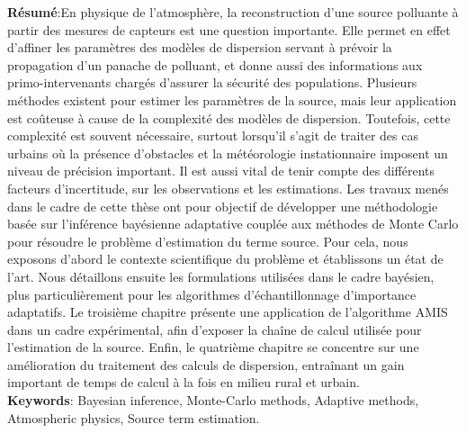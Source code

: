 {\small \textbf{Résumé}:En physique de l’atmosphère, la reconstruction d’une source polluante à partir des mesures de capteurs est une question importante. Elle permet en effet d’affiner les paramètres des modèles de dispersion servant à prévoir la propagation d’un panache de polluant, et donne aussi des informations aux primo-intervenants chargés d’assurer la sécurité des populations.
Plusieurs méthodes existent pour estimer les paramètres de la source, mais leur application est coûteuse à cause de la complexité des modèles de dispersion. Toutefois, cette complexité est souvent nécessaire, surtout lorsqu’il s’agit de traiter des cas urbains où la présence d’obstacles et la météorologie instationnaire imposent un niveau de précision important. Il est aussi vital de tenir compte des différents facteurs d’incertitude, sur les observations et les estimations.
Les travaux menés dans le cadre de cette thèse ont pour objectif de développer une méthodologie basée sur l’inférence bayésienne adaptative couplée aux méthodes de Monte Carlo pour résoudre le problème d’estimation du terme source. Pour cela, nous exposons d’abord le contexte scientifique du problème et établissons un état de l’art. Nous détaillons ensuite les formulations utilisées dans le cadre bayésien, plus particulièrement pour les algorithmes d’échantillonnage d’importance adaptatifs. Le troisième chapitre présente une application de l’algorithme AMIS dans un cadre expérimental, afin d’exposer la chaîne de calcul utilisée pour l’estimation de la source. Enfin, le quatrième chapitre se concentre sur une amélioration du traitement des calculs de dispersion, entraînant un gain important de temps de calcul à la fois en milieu rural et urbain.\\

\textbf{Keywords}: Bayesian inference, Monte-Carlo methods, Adaptive methods, Atmospheric physics, Source term estimation.
}

